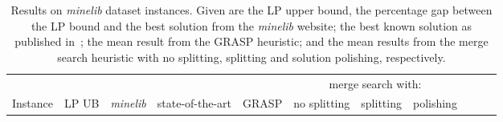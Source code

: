 \documentclass[journal]{IEEEtran}
\begin{document}
\begin{table}[t]
\centering
\caption[Results on \emph{minelib} dataset instances]{Results on \emph{minelib} dataset instances. Given are the LP upper bound, the percentage gap between the LP bound and the best solution from the \emph{minelib} website; the best known solution as published in~\cite{minelib-improved}; the mean result from the GRASP heuristic; and the mean results from the merge search heuristic with no splitting, splitting and solution polishing, respectively.
}\label{tab:mine:main}
\begin{adjustbox}{width=0.8\textwidth}
\begin{tabular}{lrrrrrrrrrr} \toprule
 & & & & & \multicolumn{3}{c}{merge search with:}\\
\cmidrule(lr){6-8}
Instance & \multicolumn{1}{c}{LP UB} & \multicolumn{1}{c}{\emph{minelib}} & \multicolumn{1}{c}{state-of-the-art}&\multicolumn{1}{c}{GRASP}&\multicolumn{1}{c}{no splitting} & \multicolumn{1}{c}{splitting}&\multicolumn{1}{c}{polishing}  \\ \midrule
%

%
\bottomrule

\end{tabular}
\end{adjustbox}
\end{table}

% 
\end{document}
